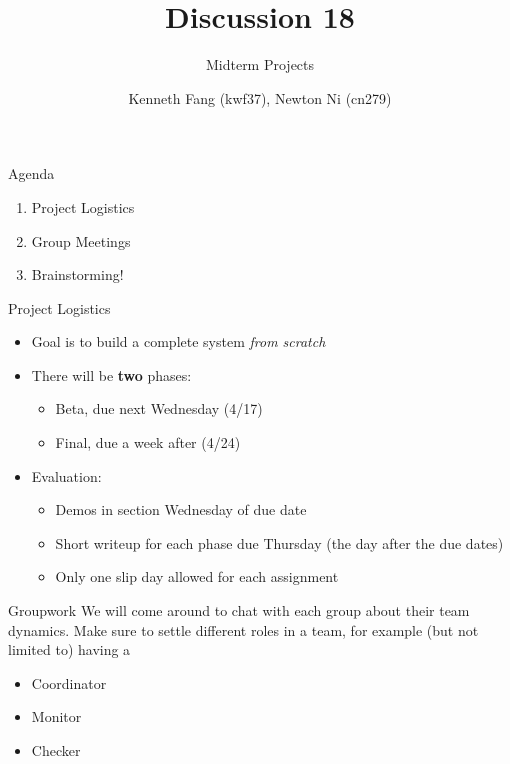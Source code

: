 \documentclass{beamer}
\title{Discussion 18}
\subtitle{Midterm Projects}
\author{Kenneth Fang (kwf37), Newton Ni (cn279)}
\begin{document}
    \begin{frame}
        \titlepage{}
    \end{frame}
    
    \begin{frame}{Agenda}
    \begin{enumerate}
        \item Project Logistics
        \item Group Meetings
        \item Brainstorming!
    \end{enumerate}
    \end{frame}
    
    \begin{frame}{Project Logistics}
        \begin{itemize}
            \item Goal is to build a complete system \textit{from scratch}
            \item There will be \textbf{two} phases:
            \begin{itemize}
                \item Beta, due next Wednesday (4/17)
                \item Final, due a week after (4/24)
            \end{itemize}
            \item Evaluation:
            \begin{itemize}
                \item Demos in section Wednesday of due date
                \item Short writeup for each phase due Thursday (the day after the due dates)
                \item Only one slip day allowed for each assignment
            \end{itemize}
        \end{itemize}
    \end{frame}
    
    \begin{frame}{Groupwork}
        We will come around to chat with each group about their team dynamics. Make sure to settle different roles in a team, for example (but not limited to) having a
        \begin{itemize}
            \item Coordinator
            \item Monitor
            \item Checker
        \end{itemize}
    \end{frame}
    
\end{document}
